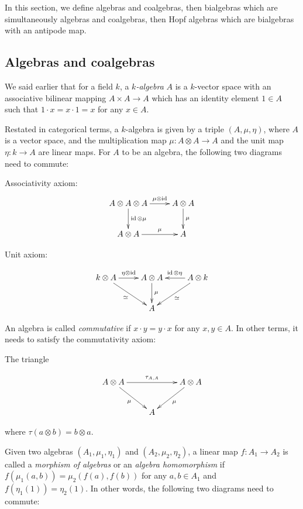 In this section, we define algebras and coalgebras, then bialgebras which are
simultaneously algebras and coalgebras, then Hopf algebras which are bialgebras
with an antipode map.

\subsection{Algebras and coalgebras}
We said earlier that for a field $k$, a \emph{$k$-algebra} $A$ is a $k$-vector
space with an
associative bilinear mapping $A \times A \to A$ which has an identity element
$1 \in A$ such that $1\cdot x = x\cdot 1 = x$ for any $x \in A$.

Restated in categorical terms, a $k$-algebra is given by a triple $(A, \mu, \eta)$,
where $A$ is a vector space, and the multiplication map $\mu: A \otimes A \to A$ and the unit map $\eta: k \to A$
are linear maps. For $A$ to be an algebra, the following two diagrams need to commute:

Associativity axiom:
\begin{equation}
\xymatrix{
A \otimes A \otimes A \ar[d]^-{\id \otimes \mu} \ar[r]^-{\mu \otimes \id} & A \otimes A \ar[d]^-{\mu}\\
 A \otimes A \ar[r]^-\mu & A 
}
\end{equation}

Unit axiom: 

\begin{equation}
    \xymatrix{
    k \otimes A \ar[r]^-{\eta \otimes \id} \ar[rd]_\simeq & A \otimes A \ar[d]^-\mu & A \otimes k \ar[l]_{\id \otimes \eta} \ar[ld]^-{\simeq} \\
    & A &
    }
\end{equation}

An algebra is called \emph{commutative} if $x \cdot y = y \cdot x$ for any
$x,y\in A$. In other terms, it needs to satisfy the commutativity axiom:

The triangle 

\begin{equation}
    \xymatrix{
    A \otimes A \ar[rr]^-{\tau_{A,A}} \ar[rd]_\mu & & A \otimes A \ar[ld]^-\mu \\
    & A &
    }
\end{equation}

where $\tau(a \otimes b) = b \otimes a$.

Given two algebras $(A_1, \mu_1, \eta_1)$ and $(A_2, \mu_2, \eta_2)$, a linear
map $f: A_1 \to A_2$ is called a \emph{morphism of algebras} or an
\emph{algebra homomorphism} if $f(\mu_1(a,b)) = \mu_2(f(a), f(b))$ for any
$a,b\in A_1$ and $f(\eta_1(1)) = \eta_2(1)$. In other words, the following two
diagrams need to commute:


